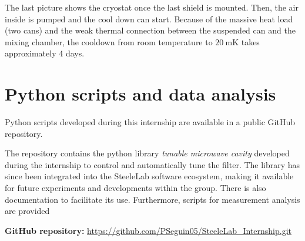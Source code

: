 \documentclass[11pt,a4pape,longbibliography]{article}
\begin{document}
The last picture shows the cryostat once the last shield is mounted. Then, the air inside is pumped and the cool down can start. Because of the massive heat load (two cans) and the weak thermal connection between the suspended can and the mixing chamber, the cooldown from room temperature to $\SI{20}{\milli\kelvin}$ takes approximately 4 days.

\section{Python scripts and data analysis}
\label{apx:python}

Python scripts developed during this internship are available in a public GitHub repository. 

The repository contains the python library \textit{tunable microwave cavity} developed during the internship to control and automatically tune the filter. The library has since been integrated into the SteeleLab software ecosystem, making it available for future experiments and developments within the group. There is also documentation to facilitate its use. Furthermore, scripts for measurement analysis are provided

\textbf{GitHub repository:} \url{https://github.com/PSeguin05/SteeleLab_Internship.git} 
\end{document}
